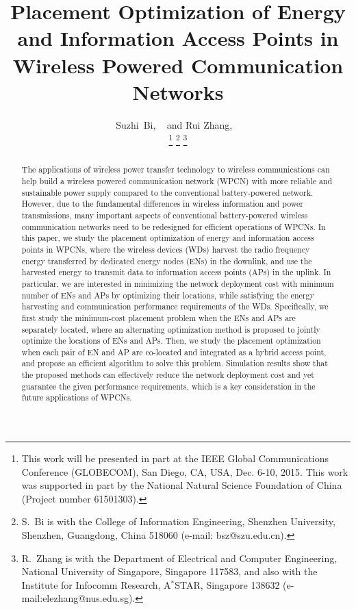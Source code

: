 \documentclass[journal, draftcls, one column, 12pt]{IEEEtran}
\begin{document}
\title{Placement Optimization of Energy and Information Access Points in Wireless Powered Communication Networks}
\author{Suzhi~Bi, ~ and Rui Zhang, ~ \\
                \thanks{This work will be presented in part at the IEEE Global Communications Conference (GLOBECOM), San Diego, CA, USA, Dec. 6-10, 2015. This work was supported in part by the National Natural Science Foundation of China (Project number 61501303).}
        \thanks{S.~Bi is with the College of Information Engineering, Shenzhen University, Shenzhen, Guangdong, China 518060 (e-mail: bsz@szu.edu.cn).}
        \thanks{R.~Zhang is with the Department of Electrical and Computer Engineering, National University of Singapore, Singapore 117583, and also with the Institute for Infocomm Research, A$^*$STAR, Singapore 138632 (e-mail:elezhang@nus.edu.sg).} }

\maketitle

\vspace{-25pt}

\begin{abstract}
The applications of wireless power transfer technology to wireless communications can help build a wireless powered communication network (WPCN) with more reliable and sustainable power supply compared to the conventional battery-powered network. However, due to the fundamental differences in wireless information and power transmissions, many important aspects of conventional battery-powered wireless communication networks need to be redesigned for efficient operations of WPCNs. In this paper, we study the placement optimization of energy and information access points in WPCNs, where the wireless devices (WDs) harvest the radio frequency energy transferred by dedicated energy nodes (ENs) in the downlink, and use the harvested energy to transmit data to information access points (APs) in the uplink. In particular, we are interested in minimizing the network deployment cost with minimum number of ENs and APs by optimizing their locations, while satisfying the energy harvesting and communication performance requirements of the WDs. Specifically, we first study the minimum-cost placement problem when the ENs and APs are separately located, where an alternating optimization method is proposed to jointly optimize the locations of ENs and APs. Then, we study the placement optimization when each pair of EN and AP are co-located and integrated as a hybrid access point, and propose an efficient algorithm to solve this problem. Simulation results show that the proposed methods can effectively reduce the network deployment cost and yet guarantee the given performance requirements, which is a key consideration in the future applications of WPCNs.
\end{abstract}
\end{document}
